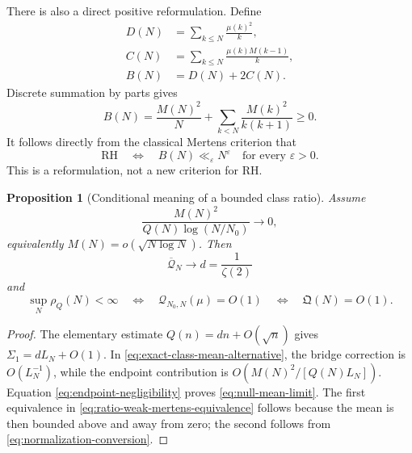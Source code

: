 \documentclass[11pt,reqno]{amsart}
\numberwithin{equation}{section}
\theoremstyle{plain}
\newtheorem{proposition}[theorem]{Proposition}
\theoremstyle{definition}
\theoremstyle{remark}
\newcommand{\QF}{\mathcal Q}
\newcommand{\eps}{\varepsilon}
\begin{document}
There is also a direct positive reformulation.  Define
\begin{align}
D(N)&=\sum_{k\leq N}\frac{\mu(k)^2}{k},
\label{eq:diagonal-bilinear-sum}\\
C(N)&=\sum_{k\leq N}\frac{\mu(k)M(k-1)}{k},
\label{eq:cross-bilinear-sum}\\
B(N)&=D(N)+2C(N).
\label{eq:positive-bilinear-functional}
\end{align}
Discrete summation by parts gives
\begin{equation}
B(N)=\frac{M(N)^2}{N}
+\sum_{k<N}\frac{M(k)^2}{k(k+1)}\geq0.
\label{eq:positive-bilinear-representation}
\end{equation}
It follows directly from the classical Mertens criterion that
\begin{equation}
\mathrm{RH}\quad\Longleftrightarrow\quad
B(N)\ll_{\eps}N^{\eps}\quad\text{for every }\eps>0.
\label{eq:positive-rh-criterion}
\end{equation}
This is a reformulation, not a new criterion for RH.

\begin{proposition}[Conditional meaning of a bounded class ratio]
\label{prop:conditional-ratio-meaning}
Assume
\begin{equation}
\frac{M(N)^2}{Q(N)\log(N/N_0)}\longrightarrow0,
\label{eq:endpoint-negligibility}
\end{equation}
equivalently \(M(N)=o(\sqrt{N\log N})\).  Then
\begin{equation}
\overline{\QF}_N\longrightarrow d=\frac1{\zeta(2)}
\label{eq:null-mean-limit}
\end{equation}
and
\begin{equation}
\sup_N\rho_Q(N)<\infty
\quad\Longleftrightarrow\quad
\QF_{N_0,N}(\mu)=O(1)
\quad\Longleftrightarrow\quad
\mathfrak Q(N)=O(1).
\label{eq:ratio-weak-mertens-equivalence}
\end{equation}
\end{proposition}

\begin{proof}
The elementary estimate \(Q(n)=dn+O(\sqrt n)\) gives
\(\Sigma_1=dL_N+O(1)\).  In
\eqref{eq:exact-class-mean-alternative}, the bridge correction is
\(O(L_N^{-1})\), while the endpoint contribution is
\(O(M(N)^2/[Q(N)L_N])\).  Equation \eqref{eq:endpoint-negligibility} proves
\eqref{eq:null-mean-limit}.  The first equivalence in
\eqref{eq:ratio-weak-mertens-equivalence} follows because the mean is then
bounded above and away from zero; the second follows from
\eqref{eq:normalization-conversion}.
\end{proof}
\end{document}
